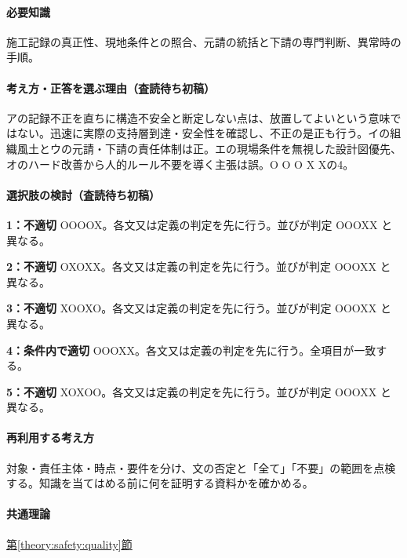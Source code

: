 \paragraph{必要知識} 施工記録の真正性、現地条件との照合、元請の統括と下請の専門判断、異常時の手順。

\paragraph{考え方・正答を選ぶ理由（査読待ち初稿）} アの記録不正を直ちに構造不安全と断定しない点は、放置してよいという意味ではない。迅速に実際の支持層到達・安全性を確認し、不正の是正も行う。イの組織風土とウの元請・下請の責任体制は正。エの現場条件を無視した設計図優先、オのハード改善から人的ルール不要を導く主張は誤。O O O X Xの4。

\paragraph{選択肢の検討（査読待ち初稿）}\mbox{}\par

\noindent\textbf{1：不適切} OOOOX。各文又は定義の判定を先に行う。並びが判定 OOOXX と異なる。\par

\noindent\textbf{2：不適切} OXOXX。各文又は定義の判定を先に行う。並びが判定 OOOXX と異なる。\par

\noindent\textbf{3：不適切} XOOXO。各文又は定義の判定を先に行う。並びが判定 OOOXX と異なる。\par

\noindent\textbf{4：条件内で適切} OOOXX。各文又は定義の判定を先に行う。全項目が一致する。\par

\noindent\textbf{5：不適切} XOXOO。各文又は定義の判定を先に行う。並びが判定 OOOXX と異なる。\par

\paragraph{再利用する考え方} 対象・責任主体・時点・要件を分け、文の否定と「全て」「不要」の範囲を点検する。知識を当てはめる前に何を証明する資料かを確かめる。

\paragraph{共通理論} \hyperref[theory:safety:quality]{第\ref*{theory:safety:quality}節}

